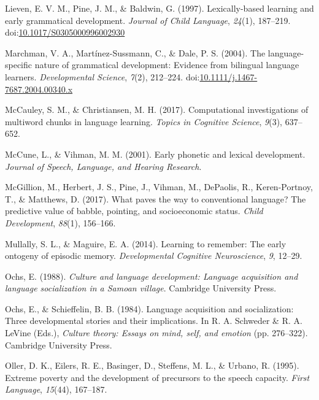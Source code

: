\documentclass[,man,floatsintext]{apa6}
\begin{document}
\hypertarget{ref-lieven1997lexically}{}
Lieven, E. V. M., Pine, J. M., \& Baldwin, G. (1997). Lexically-based
learning and early grammatical development. \emph{Journal of Child
Language}, \emph{24}(1), 187--219.
doi:\href{https://doi.org/10.1017/S0305000996002930}{10.1017/S0305000996002930}

\hypertarget{ref-marchman2004language}{}
Marchman, V. A., Martínez-Sussmann, C., \& Dale, P. S. (2004). The
language-specific nature of grammatical development: Evidence from
bilingual language learners. \emph{Developmental Science}, \emph{7}(2),
212--224.
doi:\href{https://doi.org/10.1111/j.1467-7687.2004.00340.x}{10.1111/j.1467-7687.2004.00340.x}

\hypertarget{ref-mccauley2017computational}{}
McCauley, S. M., \& Christiansen, M. H. (2017). Computational
investigations of multiword chunks in language learning. \emph{Topics in
Cognitive Science}, \emph{9}(3), 637--652.

\hypertarget{ref-mccune2001early}{}
McCune, L., \& Vihman, M. M. (2001). Early phonetic and lexical
development. \emph{Journal of Speech, Language, and Hearing Research}.

\hypertarget{ref-mcgillion2017paves}{}
McGillion, M., Herbert, J. S., Pine, J., Vihman, M., DePaolis, R.,
Keren-Portnoy, T., \& Matthews, D. (2017). What paves the way to
conventional language? The predictive value of babble, pointing, and
socioeconomic status. \emph{Child Development}, \emph{88}(1), 156--166.

\hypertarget{ref-mullally2014learning}{}
Mullally, S. L., \& Maguire, E. A. (2014). Learning to remember: The
early ontogeny of episodic memory. \emph{Developmental Cognitive
Neuroscience}, \emph{9}, 12--29.

\hypertarget{ref-ochs1988culture}{}
Ochs, E. (1988). \emph{Culture and language development: Language
acquisition and language socialization in a Samoan village}. Cambridge
University Press.

\hypertarget{ref-ochs1984language}{}
Ochs, E., \& Schieffelin, B. B. (1984). Language acquisition and
socialization: Three developmental stories and their implications. In R.
A. Schweder \& R. A. LeVine (Eds.), \emph{Culture theory: Essays on
mind, self, and emotion} (pp. 276--322). Cambridge University Press.

\hypertarget{ref-oller1995extreme}{}
Oller, D. K., Eilers, R. E., Basinger, D., Steffens, M. L., \& Urbano,
R. (1995). Extreme poverty and the development of precursors to the
speech capacity. \emph{First Language}, \emph{15}(44), 167--187.
\end{document}

